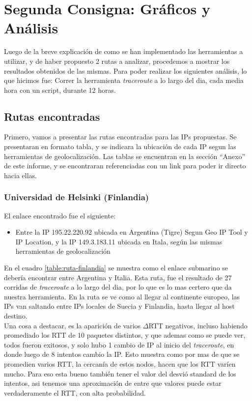 \section{Segunda Consigna: Gráficos y Análisis}

Luego de la breve explicación de como se han implementado las herramientas a utilizar, y de haber propuesto 2 rutas a analizar, procedemos a mostrar los resultados obtenidos de las mismas. Para poder realizar los siguientes análisis, lo que hicimos fue: Correr la herramienta \textit{traceroute} a lo largo del dia, cada media hora con un script, durante 12 horas.

\subsection{Rutas encontradas}

Primero, vamos a presentar las rutas encontradas para las IPs propuestas. Se presentaran en formato tabla, y se indicara la ubicación de cada IP segun las herramientas de geolocalización. Las tablas se encuentran en la sección ``Anexo'' de este informe, y se encontraran referenciadas con un link para poder ir directo hacia ellas.

\subsubsection{Universidad de Helsinki (Finlandia)}

El enlace encontrado fue el siguiente:

\begin{itemize}
	\item Entre la IP 195.22.220.92 ubicada en Argentina (Tigre) Segun Geo IP Tool y IP Location, y la IP 149.3.183.11 ubicada en Itala, según las mismas herramientas de geolocalización
\end{itemize}

En el cuadro \ref{table:ruta-finlandia} se muestra como el enlace submarino se debería encontrar entre Argentina y Italia. Esta ruta, fue el resultado de 27 corridas de \textit{traceroute} a lo largo del dia, por lo que es lo mas certero que da nuestra herramienta. En la ruta se ve como al llegar al continente europeo, las IPs van saltando entre IPs locales de Suecia y Finlandia, hasta llegar al host destino.\\

Una cosa a destacar, es la aparición de varios $\Delta$RTT negativos, incluso habiendo promediado los RTT de 10 paquetes distintos, y que ademas como se puede ver, todos fueron exitosos, y solo hubo 1 cambio de IP al inicio del \textit{traceroute}, en donde luego de 8 intentos cambio la IP. Esto muestra como por mas de que se promedien varios RTT, la cercanía de estos nodos, hacen que los RTT varíen mucho. Para eso esta bueno también tener el valor del desvió standard de los intentos, asi tenemos una aproximación de entre que valores puede estar verdaderamente el RTT, con alta probabilidad.

